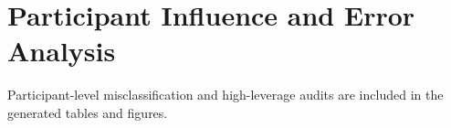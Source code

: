 \section{Participant Influence and Error Analysis}
Participant-level misclassification and high-leverage audits are included in the generated tables and figures.
